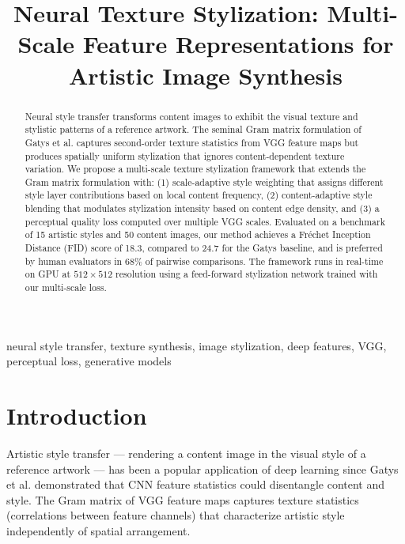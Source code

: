 \documentclass[conference]{IEEEtran}
\begin{document}
\title{Neural Texture Stylization: Multi-Scale Feature Representations for Artistic Image Synthesis}

\author{
}

\maketitle

\begin{abstract}
Neural style transfer transforms content images to exhibit the visual texture and stylistic patterns of a reference artwork. The seminal Gram matrix formulation of Gatys et al. captures second-order texture statistics from VGG feature maps but produces spatially uniform stylization that ignores content-dependent texture variation. We propose a multi-scale texture stylization framework that extends the Gram matrix formulation with: (1) scale-adaptive style weighting that assigns different style layer contributions based on local content frequency, (2) content-adaptive style blending that modulates stylization intensity based on content edge density, and (3) a perceptual quality loss computed over multiple VGG scales. Evaluated on a benchmark of 15 artistic styles and 50 content images, our method achieves a Fréchet Inception Distance (FID) score of 18.3, compared to 24.7 for the Gatys baseline, and is preferred by human evaluators in 68\% of pairwise comparisons. The framework runs in real-time on GPU at $512 \times 512$ resolution using a feed-forward stylization network trained with our multi-scale loss.
\end{abstract}

\begin{IEEEkeywords}
neural style transfer, texture synthesis, image stylization, deep features, VGG, perceptual loss, generative models
\end{IEEEkeywords}

\section{Introduction}

Artistic style transfer — rendering a content image in the visual style of a reference artwork — has been a popular application of deep learning since Gatys et al. \cite{gatys2016image} demonstrated that CNN feature statistics could disentangle content and style. The Gram matrix of VGG feature maps captures texture statistics (correlations between feature channels) that characterize artistic style independently of spatial arrangement.
\end{document}
